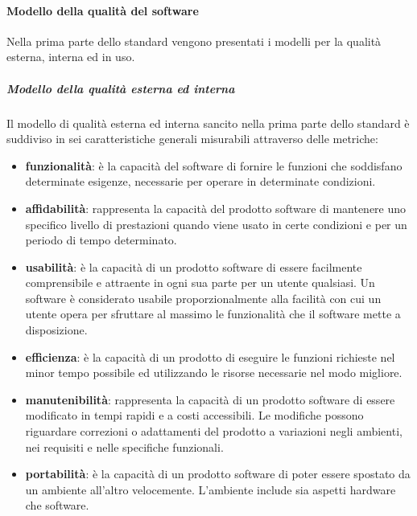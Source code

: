 			\paragraph{Modello della qualità del software}
			Nella prima parte dello standard vengono presentati i modelli per la qualità esterna, interna ed in uso.
				\subparagraph{Modello della qualità esterna ed interna}
				Il modello di qualità esterna ed interna sancito nella prima parte dello standard è suddiviso in sei caratteristiche generali misurabili attraverso delle metriche:
				\begin{itemize}
					\item \textbf{funzionalità}: è la capacità del software di fornire le funzioni che soddisfano determinate esigenze, necessarie per operare in determinate condizioni. 
					\item \textbf{affidabilità}: rappresenta la capacità del prodotto software di mantenere uno specifico livello di prestazioni quando viene usato in certe condizioni e per un periodo di tempo determinato.
					\item \textbf{usabilità}: è la capacità di un prodotto software di essere facilmente comprensibile e attraente in ogni sua parte per un utente qualsiasi. Un software è considerato usabile proporzionalmente alla facilità con cui un utente opera per sfruttare al massimo le funzionalità che il software mette a disposizione.
					\item \textbf{efficienza}: è la capacità di un prodotto di eseguire le funzioni richieste nel minor tempo possibile ed utilizzando le risorse necessarie nel modo migliore.
					\item \textbf{manutenibilità}: rappresenta la capacità di un prodotto software di essere modificato in tempi rapidi e a costi accessibili. Le modifiche possono riguardare correzioni o adattamenti del prodotto a variazioni negli ambienti, nei requisiti e nelle specifiche funzionali.
					\item \textbf{portabilità}: è la capacità di un prodotto software di poter essere spostato da un ambiente all'altro velocemente. L'ambiente include sia aspetti hardware che software.
				\end{itemize}
				
